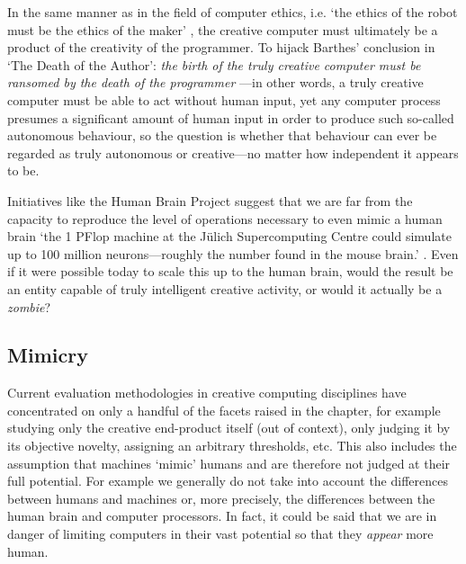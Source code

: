 In the same manner as in the field of computer ethics, i.e. `the ethics of the robot must be the ethics of the maker' \autocite{Mcbride2012}, the creative computer must ultimately be a product of the creativity of the programmer. To hijack Barthes' conclusion in `The Death of the Author': \emph{the birth of the truly creative computer must be ransomed by the death of the programmer} \autocite{Barthes1967}---in other words, a truly creative computer must be able to act without human input, yet any computer process presumes a significant amount of human input in order to produce such so-called autonomous behaviour, so the question is whether that behaviour can ever be regarded as truly autonomous or creative---no matter how independent it appears to be.

Initiatives like the Human Brain Project suggest that we are far from the capacity to reproduce the level of operations necessary to even mimic a human brain `the \num{1} PFlop machine at the J{\"u}lich Supercomputing Centre could simulate up to \num{100} million neurons---roughly the number found in the mouse brain.' \autocite{Walker2012}. Even if it were possible today to scale this up to the human brain, would the result be an entity capable of truly intelligent creative activity, or would it actually be a \emph{zombie}?


\subsection{Mimicry}
\label{s:mimicry}

Current evaluation methodologies in creative computing disciplines have concentrated on only a handful of the facets raised in the  chapter, for example studying only the creative end-product itself (out of context), only judging it by its objective novelty, assigning an arbitrary thresholds, etc. This also includes the assumption that machines `mimic' humans and are therefore not judged at their full potential. For example we generally do not take into account the differences between humans and machines or, more precisely, the differences between the human brain and computer processors. In fact, it could be said that we are in danger of limiting computers in their vast potential so that they \emph{appear} more human.

